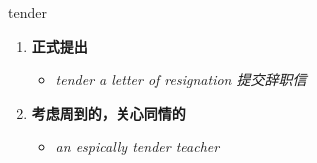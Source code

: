 
\begin{frame}
{\huge tender}
\begin{center}
\begin{enumerate}\Large
  \item \textbf{正式提出}
  \begin{itemize}
    \item \em{\Large{tender a letter of resignation 提交辞职信}}
  \end{itemize}
  \item \textbf{考虑周到的，关心同情的}
  \begin{itemize}
    \item \em{\Large{an espically tender teacher}}
  \end{itemize}
\end{enumerate}
\end{center}
\end{frame}
